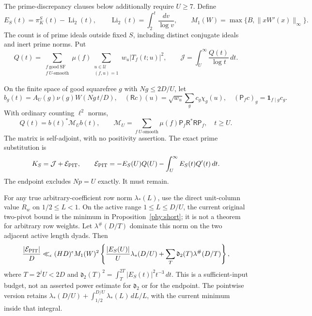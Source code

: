 The prime-discrepancy clauses below additionally require $U\ge7$.
Define
\[
 E_S(t)=\pi_K^S(t)-\operatorname{Li}_2(t),\qquad
 \operatorname{Li}_2(t)=\int_2^t\frac{dv}{\log v},\qquad
 M_1(W)=\max\{B,\|xW'(x)\|_\infty\}.
\]
The count is of prime ideals outside fixed $S$, including distinct
conjugate ideals and inert prime norms. Put
\[
 Q(t)=\sum_{\substack{f\ \mathrm{good\ SF}\\f\ U\text{-smooth}}}
       \mu(f)\sum_{\substack{u\in\mathcal U\\(f,u)=1}}
                   w_u|T_f(t;u)|^2,
 \qquad
 \mathcal J=\int_U^\infty\frac{Q(t)}{\log t}\,dt.
\]

\begin{proposition}\label{cmr:joint}
On the finite space of good squarefree $g$ with $Ng\le2D/U$, let
\[
 b_g(t)=A_U(g)\nu(g)W(Ng\,t/D),\quad
 (\mathsf Rc)(u)=\sqrt{w_u}\sum_g c_g\chi_g(u),\quad
 (\mathsf P_fc)_g=\mathbf1_{f\mid g}c_g.
\]
With ordinary counting $\ell^2$ norms,
\begin{equation}\label{cmr:joint-form}
 Q(t)=b(t)^*\mathcal M_Ub(t),\qquad
 \mathcal M_U=\sum_{f\ U\text{-smooth}}\mu(f)
                \mathsf P_f\mathsf R^*\mathsf R\mathsf P_f,
 \quad t\ge U.
\end{equation}
The matrix is self-adjoint, with no positivity assertion. The exact
prime substitution is
\begin{equation}\label{cmr:primeerror}
 K_S=\mathcal J+\mathcal E_{\rm PIT},\qquad
 \mathcal E_{\rm PIT}=-E_S(U)Q(U)
                      -\int_U^\infty E_S(t)Q'(t)\,dt.
\end{equation}
The endpoint excludes $Np=U$ exactly. It must remain.
\end{proposition}

For any true arbitrary-coefficient row norm $\lambda_*(L)$, use the
direct unit-column value $R_w$ on $1/2\le L<1$. On the active range
$1\le L\le D/U$, the current original two-pivot bound is the
minimum in Proposition~\ref{phy:short};
it is not a theorem for arbitrary row weights. Let $\lambda^\#(D/T)$
dominate this norm on the two adjacent active length dyads. Then
\begin{equation}\label{cmr:square-budget}
 \frac{|\mathcal E_{\rm PIT}|}D
 \ll_\epsilon(HD)^\epsilon M_1(W)^2
 \left\{\frac{|E_S(U)|}{U}\lambda_*(D/U)
          +\sum_T\mathfrak d_2(T)\lambda^\#(D/T)\right\},
\end{equation}
where $T=2^jU<2D$ and
$\mathfrak d_2(T)^2=\int_T^{2T}|E_S(t)|^2t^{-3}\,dt$.
This is a sufficient-input budget, not an asserted power estimate for
$\mathfrak d_2$ or for the endpoint. The pointwise version retains
$\lambda_*(D/U)+\int_{1/2}^{D/U}\lambda_*(L)\,dL/L$,
with the current minimum inside that integral.

